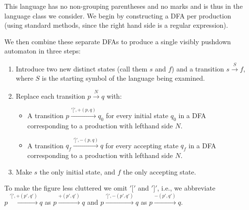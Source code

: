 \documentclass[runningheads]{llncs}
\newcommand{\pospl}{[}
\newcommand{\pospr}{]}
\begin{document}
\noindent This language has no non-grouping parentheses and no marks and is thus in the language class we consider. We begin by constructing a DFA per production (using standard methods, since the right hand side is a regular expression).

\begin{center}
\end{center}

\noindent We then combine these separate DFAs to produce a single visibly pushdown automaton in three steps:

\begin{enumerate}
\item Introduce two new distinct states (call them $s$ and $f$) and a transition $s \xrightarrow{S} f$, where $S$ is the starting symbol of the language being examined.
\item Replace each transition $p \xrightarrow{N} q$ with:
  \begin{itemize}
  \item A transition $p \xrightarrow{'\pospl', +(p,q)} q_0$ for every initial state $q_0$ in a DFA corresponding to a production with lefthand side $N$.
  \item A transition $q_f \xrightarrow{'\pospr', -(p,q)} q$ for every accepting state $q_f$ in a DFA corresponding to a production with lefthand side $N$.
  \end{itemize}
\item Make $s$ the only initial state, and $f$ the only accepting state.
\end{enumerate}

\noindent To make the figure less cluttered we omit $'\pospl'$ and $'\pospr'$, i.e., we abbreviate $p \xrightarrow{'\pospl', +(p',q')} q$ as $p \xrightarrow{+(p', q')} q$ and $p \xrightarrow{'\pospr', -(p',q')} q$ as $p \xrightarrow{-(p', q')} q$.
\end{document}
